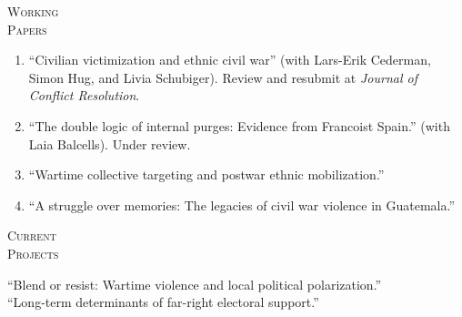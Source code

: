 \documentclass[a4paper, 11pt]{article}
\begin{document}
\noindent
\begin{minipage}[t]{0.14\textwidth}
  \flushleft
  \textsc{\small Working\\Papers}
\end{minipage}
\begin{minipage}[t]{0.86\textwidth}
	\vspace{-7pt}
  \begin{enumerate}[leftmargin=*, nolistsep]
  \item ``Civilian victimization and ethnic civil war'' (with Lars-Erik Cederman, Simon Hug, and Livia Schubiger). Review and resubmit at \textit{Journal of Conflict Resolution}.
	\item ``The double logic of internal purges: Evidence from Francoist Spain.'' (with Laia Balcells). Under review.
	\item ``Wartime collective targeting and postwar ethnic mobilization.''
	\item ``A struggle over memories: The legacies of civil war violence in Guatemala.''\\
  \end{enumerate}
\end{minipage}

\vspace{20pt}


\noindent
\begin{minipage}[t]{0.14\textwidth}
  \flushleft
  \textsc{\small Current\\Projects}
\end{minipage}
\begin{minipage}[t]{0.86\textwidth}
	\vspace{-7pt}
	``Blend or resist: Wartime violence and local political polarization.''\\
	``Long-term determinants of far-right electoral support.''\\
\end{minipage}

\vspace{20pt}

\end{document}
